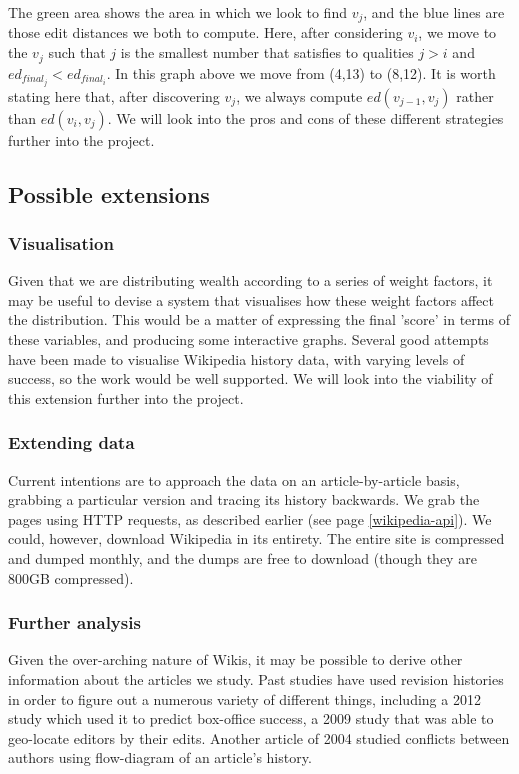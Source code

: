 \documentclass[a4paper,11pt,twoside,notitlepage]{article}
\begin{document}
        The green area shows the area in which we look to find $v_j$,
        and the blue lines are those edit distances we both to
        compute. Here, after considering $v_i$, we move to the $v_j$
        such that $j$ is the smallest number that satisfies to
        qualities $j > i$ and $ed_{final_j} < ed_{final_i}$. In this
        graph above we move from (4,13) to (8,12). It is worth stating
        here that, after discovering $v_j$, we always compute
        $ed(v_{j-1}, v_j)$ rather than $ed(v_i,v_j)$. We will look
        into the pros and cons of these different strategies further
        into the project.

        \subsection*{Possible extensions}
        \subsubsection*{Visualisation}
        Given that we are distributing wealth according to a series of
        weight factors, it may be useful to devise a system that
        visualises how these weight factors affect the
        distribution. This would be a matter of expressing the final
        'score' in terms of these variables, and producing some
        interactive graphs. Several good attempts have been made to
        visualise Wikipedia history data, with varying levels of
        success,\cite{Chi2008}\cite{Sabel2007}\cite{Suh2007}\cite{Wu2013} so the
        work would be well supported. We will look into the viability
        of this extension further into the project.
        
        \subsubsection*{Extending data}
        Current intentions are to approach the data on an
        article-by-article basis, grabbing a particular version and
        tracing its history backwards. We grab the pages using HTTP
        requests, as described earlier (see page
        \ref{wikipedia-api}). We could, however, download Wikipedia in
        its entirety. The entire site is compressed and dumped
        monthly, and the dumps are free to download (though they are
        800GB compressed).\cite{wiki-dump}

        \subsubsection*{Further analysis}
        Given the over-arching nature of Wikis, it may be possible to
        derive other information about the articles we
        study. Past studies have used revision histories in order to
        figure out a numerous variety of different things, including a
        2012 study which used it to predict box-office
        success,\cite{Mestyan2012} a 2009 study that was able to
        geo-locate editors by their edits.\cite{Lieberman2009} Another
        article of 2004 studied conflicts between authors using
        flow-diagram of an article's history.\cite{Viegas2004}
\end{document}
